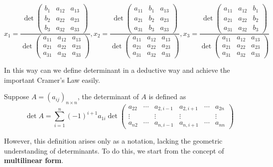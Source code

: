 $$
x_1 = \frac{\operatorname{det} \begin{pmatrix}
b_{1} & a_{12} & a_{13} \\
b_{2} & a_{22} & a_{23} \\ 
b_{3} & a_{32} & a_{33}
\end{pmatrix}}{\operatorname{det} \begin{pmatrix}
a_{11} & a_{12} & a_{13} \\
a_{21} & a_{22} & a_{23} \\
a_{31} & a_{32} & a_{33}
\end{pmatrix}},
x_2 = \frac{\operatorname{det} \begin{pmatrix}
a_{11} & b_{1} & a_{13} \\ 
a_{21} & b_{2} & a_{23} \\ 
a_{31} & b_{3} & a_{33}
\end{pmatrix}}{\operatorname{det} \begin{pmatrix}
a_{11} & a_{12} & a_{13} \\
a_{21} & a_{22} & a_{23} \\
a_{31} & a_{32} & a_{33}
\end{pmatrix}},
x_3 = \frac{\operatorname{det} \begin{pmatrix}
a_{11} & a_{12} & b_{1} \\ 
a_{21} & a_{22} & b_{2} \\ 
a_{31} & a_{32} & b_{3}
\end{pmatrix}}{\operatorname{det} \begin{pmatrix}
a_{11} & a_{12} & a_{13} \\
a_{21} & a_{22} & a_{23} \\
a_{31} & a_{32} & a_{33}
\end{pmatrix}}$$

In this way can we define determinant in a deductive way and achieve the important Cramer's Law easily. 
\begin{definition}
    Suppose $A = (a_{ij})_{n\times n}$, the determinant of $A$ is defined as 
    $$\det A = \sum_{i = 1}^{n} (-1)^{i+1} a_{1i} \det \begin{pmatrix}
        a_{22} &\cdots &a_{2,i-1} & a_{2,i+1} & \cdots & a_{2n}\\
        \vdots &&\vdots&\vdots&& \vdots \\
        a_{n2} &\cdots &a_{n,i-1} & a_{n,i+1} & \cdots & a_{nn}
    \end{pmatrix}$$
\end{definition}

However, this definition arises only as a notation, lacking the geometric understanding of determinants. To do this, we start from the concept of \textbf{multilinear form}.

